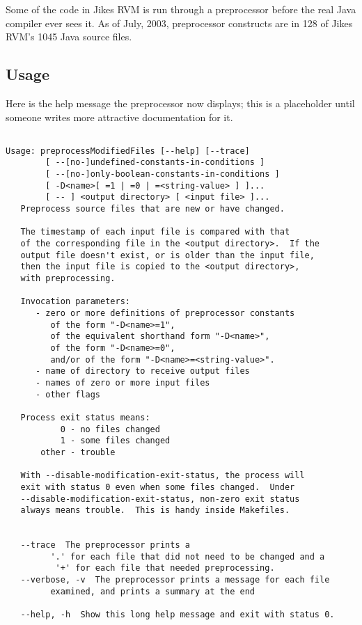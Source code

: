 Some of the code in Jikes RVM is run through a preprocessor before the
real Java compiler ever sees it.  As of July, 2003, preprocessor
constructs are in 128 of Jikes RVM's 1045 Java source files.

\subsection{Usage}

Here is the help message the preprocessor now displays; this
is a placeholder until someone writes more attractive documentation
for it.

\begin{verbatim}

Usage: preprocessModifiedFiles [--help] [--trace]
        [ --[no-]undefined-constants-in-conditions ]
        [ --[no-]only-boolean-constants-in-conditions ]
        [ -D<name>[ =1 | =0 | =<string-value> ] ]... 
        [ -- ] <output directory> [ <input file> ]...
   Preprocess source files that are new or have changed.

   The timestamp of each input file is compared with that
   of the corresponding file in the <output directory>.  If the
   output file doesn't exist, or is older than the input file,
   then the input file is copied to the <output directory>, 
   with preprocessing.

   Invocation parameters:
      - zero or more definitions of preprocessor constants
         of the form "-D<name>=1",
         of the equivalent shorthand form "-D<name>", 
         of the form "-D<name>=0",
         and/or of the form "-D<name>=<string-value>".
      - name of directory to receive output files
      - names of zero or more input files
      - other flags

   Process exit status means:
           0 - no files changed
           1 - some files changed
       other - trouble

   With --disable-modification-exit-status, the process will
   exit with status 0 even when some files changed.  Under
   --disable-modification-exit-status, non-zero exit status
   always means trouble.  This is handy inside Makefiles.


   --trace  The preprocessor prints a 
         '.' for each file that did not need to be changed and a 
          '+' for each file that needed preprocessing.
   --verbose, -v  The preprocessor prints a message for each file
         examined, and prints a summary at the end 

   --help, -h  Show this long help message and exit with status 0.


\end{verbatim}
